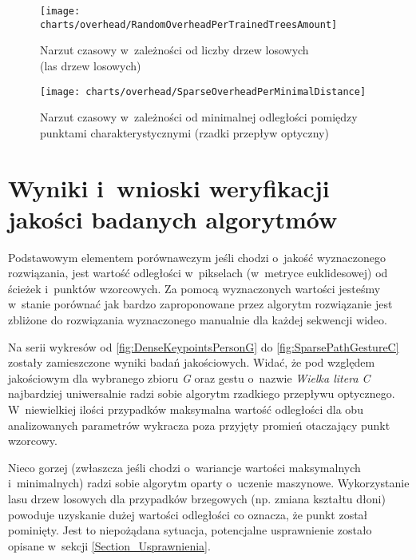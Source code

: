     \begin{figure}[!ht]
      \centering
      \texttt{[image: charts/overhead/RandomOverheadPerTrainedTreesAmount]}
      \caption[Narzut czasowy w~zależności od liczby drzew losowych]
              {Narzut czasowy w~zależności od liczby drzew losowych\\(las drzew losowych)}
      \label{fig:SpecialisedRandomOverhead}
    \end{figure}

    \begin{figure}[!ht]
      \centering
      \texttt{[image: charts/overhead/SparseOverheadPerMinimalDistance]}
      \caption[Narzut czasowy w~zależności od minimalnej odległości pomiędzy punktami charakterystycznymi]
              {Narzut czasowy w~zależności od minimalnej odległości pomiędzy punktami charakterystycznymi (rzadki przepływ optyczny)}
      \label{fig:SpecialisedSparseOverhead}
    \end{figure}

  \section{Wyniki i~wnioski weryfikacji jakości badanych algorytmów}\label{Section_Quality}

    Podstawowym elementem porównawczym jeśli chodzi o~jakość wyznaczonego rozwiązania, jest wartość odległości w~pikselach (w~metryce euklidesowej) od ścieżek i~punktów wzorcowych. Za pomocą wyznaczonych wartości jesteśmy w~stanie porównać jak bardzo zaproponowane przez algorytm rozwiązanie jest zbliżone do rozwiązania wyznaczonego manualnie dla każdej sekwencji wideo.

    Na serii wykresów od \ref{fig:DenseKeypointsPersonG} do \ref{fig:SparsePathGestureC} zostały zamieszczone wyniki badań jakościowych. Widać, że pod względem jakościowym dla wybranego zbioru \textit{G} oraz gestu o~nazwie \textit{Wielka litera C} najbardziej uniwersalnie radzi sobie algorytm rzadkiego przepływu optycznego. W~niewielkiej ilości przypadków maksymalna wartość odległości dla obu analizowanych parametrów wykracza poza przyjęty promień otaczający punkt wzorcowy.

    Nieco gorzej (zwłaszcza jeśli chodzi o~wariancje wartości maksymalnych i~minimalnych) radzi sobie algorytm oparty o~uczenie maszynowe. Wykorzystanie lasu drzew losowych dla przypadków brzegowych (np. zmiana kształtu dłoni) powoduje uzyskanie dużej wartości odległości co oznacza, że punkt został pominięty. Jest to niepożądana sytuacja, potencjalne usprawnienie zostało opisane w~sekcji \ref{Section_Usprawnienia}.

